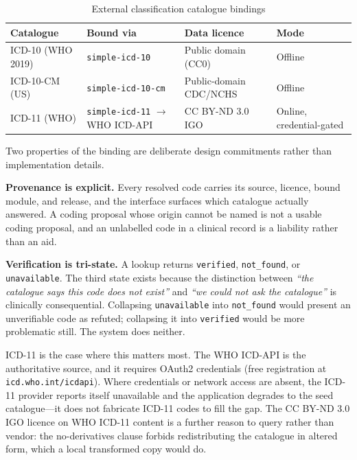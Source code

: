 \documentclass[11pt,a4paper]{article}
\begin{document}
\begin{table}[H]
\centering
\caption{External classification catalogue bindings}
\label{tab:catalog-bindings}
\begin{tabularx}{\textwidth}{lXll}
\toprule
\textbf{Catalogue} & \textbf{Bound via} & \textbf{Data licence} & \textbf{Mode} \\
\midrule
ICD-10 (WHO 2019) & \texttt{simple-icd-10} & Public domain (CC0) & Offline \\
ICD-10-CM (US) & \texttt{simple-icd-10\allowbreak-cm} & Public-domain CDC/NCHS & Offline \\
ICD-11 (WHO) & \texttt{simple-icd-11} $\rightarrow$ WHO ICD-API & CC BY-ND 3.0 IGO & Online, credential-gated \\
\bottomrule
\end{tabularx}
\end{table}

Two properties of the binding are deliberate design commitments rather than implementation details.

\textbf{Provenance is explicit.} Every resolved code carries its source, licence, bound module, and release, and the interface surfaces which catalogue actually answered. A coding proposal whose origin cannot be named is not a usable coding proposal, and an unlabelled code in a clinical record is a liability rather than an aid.

\textbf{Verification is tri-state.} A lookup returns \texttt{verified}, \texttt{not\_found}, or \texttt{unavailable}. The third state exists because the distinction between \emph{``the catalogue says this code does not exist''} and \emph{``we could not ask the catalogue''} is clinically consequential. Collapsing \texttt{unavailable} into \texttt{not\_found} would present an unverifiable code as refuted; collapsing it into \texttt{verified} would be more problematic still. The system does neither.

ICD-11 is the case where this matters most. The WHO ICD-API is the authoritative source, and it requires OAuth2 credentials (free registration at \texttt{icd.who.int/icdapi}). Where credentials or network access are absent, the ICD-11 provider reports itself unavailable and the application degrades to the seed catalogue---it does not fabricate ICD-11 codes to fill the gap. The CC BY-ND 3.0 IGO licence on WHO ICD-11 content is a further reason to query rather than vendor: the no-derivatives clause forbids redistributing the catalogue in altered form, which a local transformed copy would do.
\end{document}

